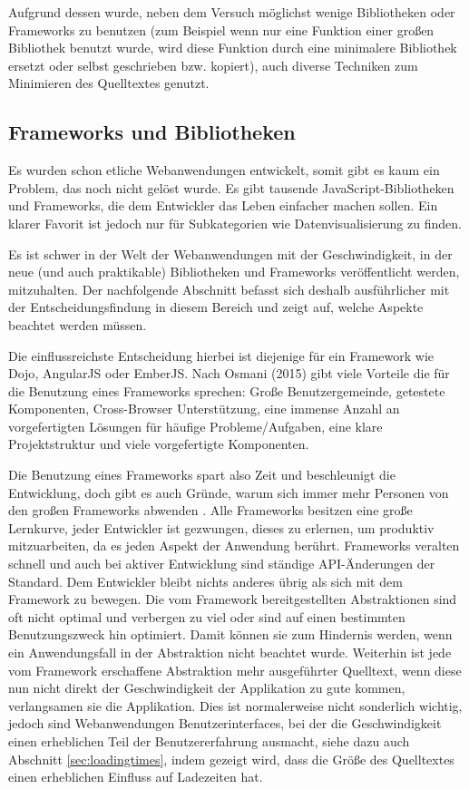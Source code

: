 \documentclass[12pt,twoside]{book}
\begin{document}
Aufgrund dessen wurde, neben dem Versuch möglichst wenige Bibliotheken oder Frameworks zu benutzen (zum Beispiel wenn nur eine Funktion einer großen Bibliothek benutzt wurde, wird diese Funktion durch eine minimalere Bibliothek ersetzt oder selbst geschrieben bzw. kopiert), auch diverse Techniken zum Minimieren des Quelltextes genutzt.

\subsection{Frameworks und Bibliotheken}

Es wurden schon etliche Webanwendungen entwickelt, somit gibt es kaum ein Problem, das noch nicht gelöst wurde. Es gibt tausende JavaScript-Bibliotheken und Frameworks, die dem Entwickler das Leben einfacher machen sollen. Ein klarer Favorit ist jedoch nur für Subkategorien wie Datenvisualisierung zu finden.

Es ist schwer in der Welt der Webanwendungen mit der Geschwindigkeit, in der neue (und auch praktikable) Bibliotheken und Frameworks veröffentlicht werden, mitzuhalten. Der nachfolgende Abschnitt befasst sich deshalb ausführlicher mit der Entscheidungsfindung in diesem Bereich und zeigt auf, welche Aspekte beachtet werden müssen.

Die einflussreichste Entscheidung hierbei ist diejenige für ein Framework wie Dojo\cite{dojo}, AngularJS\cite{angularjs} oder EmberJS\cite{emberjs}.
Nach Osmani (2015) \cite{prosandcons} gibt viele Vorteile die für die Benutzung eines Frameworks sprechen: Große Benutzergemeinde, getestete Komponenten, Cross-Browser Unterstützung, eine immense Anzahl an vorgefertigten Lösungen für häufige Probleme/Aufgaben, eine klare Projektstruktur und viele vorgefertigte Komponenten.

Die Benutzung eines Frameworks spart also Zeit und beschleunigt die Entwicklung, doch gibt es auch Gründe, warum sich immer mehr Personen von den großen Frameworks abwenden \cite{nomoreframeworks, frameworkless}.
Alle Frameworks besitzen eine große Lernkurve, jeder Entwickler ist gezwungen, dieses zu erlernen, um produktiv mitzuarbeiten, da es jeden Aspekt der Anwendung berührt. Frameworks veralten schnell und auch bei aktiver Entwicklung sind ständige API-Änderungen der Standard. Dem Entwickler bleibt nichts anderes übrig als sich mit dem Framework zu bewegen. Die vom Framework bereitgestellten Abstraktionen sind oft nicht optimal und verbergen zu viel oder sind auf einen bestimmten Benutzungszweck hin optimiert. Damit können sie zum Hindernis werden, wenn ein Anwendungsfall in der Abstraktion nicht beachtet wurde.
Weiterhin ist jede vom Framework erschaffene Abstraktion mehr ausgeführter Quelltext, wenn diese nun nicht direkt der Geschwindigkeit der Applikation zu gute kommen, verlangsamen sie die Applikation. Dies ist normalerweise nicht sonderlich wichtig, jedoch sind Webanwendungen Benutzerinterfaces, bei der die Geschwindigkeit einen erheblichen Teil der Benutzererfahrung ausmacht, siehe dazu auch Abschnitt \ref{sec:loadingtimes}, indem gezeigt wird, dass die Größe des Quelltextes einen erheblichen Einfluss auf Ladezeiten hat.
\end{document}
